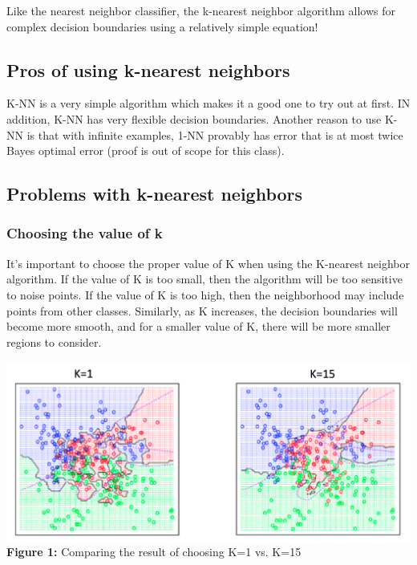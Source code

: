 \documentclass{article}
\begin{document}
Like the nearest neighbor classifier, the k-nearest neighbor algorithm allows for complex decision boundaries using a relatively simple equation!

\subsection{Pros of using k-nearest neighbors}
K-NN is a very simple algorithm which makes it a good one to try out at first. IN addition, K-NN has very flexible decision boundaries. Another reason to use K-NN is that with infinite examples, 1-NN provably has error that is at most twice Bayes optimal error (proof is out of scope for this class).

\subsection{Problems with k-nearest neighbors}


\subsubsection{Choosing the value of k}

It's important to choose the proper value of K when using the K-nearest neighbor algorithm. If the value of K is too small, then the algorithm will be too sensitive to noise points. If the value of K is too high, then the neighborhood may include points from other classes. Similarly, as K increases, the decision boundaries will become more smooth, and for a smaller value of K, there will be more smaller regions to consider.

\begin{center}
	\includegraphics[scale=0.5]{ChoosingValueOfK.png}\\
    \textbf{Figure 1:} Comparing the result of choosing K=1 vs. K=15\\
\end{center}
\end{document}
